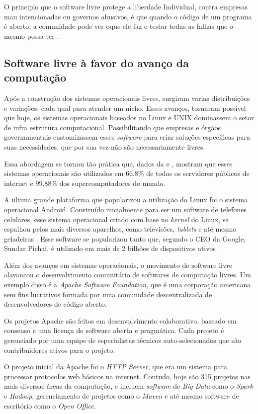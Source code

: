 O principio que o software livre protege a liberdade Individual, contra empresas mau intencionadas ou governos abusivos, é que quando o código de um programa é aberto, a comunidade pode ver oque ele faz e testar todas as falhas que o mesmo possa ter \cite{GNUOperatingSystem}.

\subsection{Software livre à favor do avanço da computação}
Após a construção dos sistemas operacionais livres, surgiram varias distribuições e variações, cada qual para atender um nicho. Esses avanços, tornaram possível que hoje, os sistemas operacionais baseados no Linux e UNIX dominassem o setor de infra estrutura computacional. Possibilitando que empresas e órgãos governamentais customizassem esses \textit{software} para criar soluções específicas para suas necessidades, que por sua vez não são necessariamente livres.

Essa abordagem se tornou tão prática que, dados da  e , mostram que esses sistemas operacionais são utilizados em $66.8\%$ de todos os servidores públicos de internet e $99.88\%$ dos supercomputadores do mundo. 

A ultima grande plataforma que popularizou a utilização do Linux foi o sistema operacional Android.  Construído inicialmente para ser um software de telefones celulares, esse sistema operacional criado com base no \textit{kernel} do Linux, se espalhou pelos mais diversos aparelhos, como televisões, \textit{tablets} e até mesmo geladeiras \cite{Riley2012}. Esse software se popularizou tanto que, segundo o CEO da Google, Sundar Pichai, é utilizado em mais de 2 bilhões de dispositivos ativos \cite{Riley2012}.

Além dos avanços em sistemas operacionais, o movimento de software livre alavancou o desenvolvimento comunitário de softwares de computação livres. Um exemplo disso é a \textit{Apache Software Foundation}, que é uma corporação americana sem fins lucrativos formada por uma comunidade descentralizada de desenvolvedores de código aberto. 

Os projetos Apache são feitos em desenvolvimento colaborativo, baseado em consenso e uma licença de software aberta e pragmática. Cada projeto é gerenciado por uma equipe de especialistas técnicos auto-selecionados que são contribuidores ativos para o projeto. 

O projeto inicial da Apache foi o \textit{HTTP Server}, que era um sistema para processar protocolos web básicos na internet. Contudo, hoje são 315 projetos nas mais diversas áreas da computação, e incluem \textit{software} de \textit{Big Data} como o \textit{Spark} e \textit{Hadoop}, gerenciamento de projetos como o \textit{Maven} e até mesmo software de escritório como o \textit{Open Office}.


